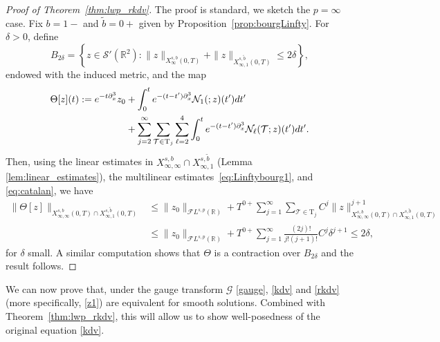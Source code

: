 \documentclass[a4paper,
11pt,  reqno]{amsart}
\makeatletter
\newcommand{\5}{\textup{V}}
\newcommand{\wt}{\widetilde}
\theoremstyle{remark}
\newcommand{\R}{\mathbb{R}}
\newcommand{\TT}{\mathcal{T}}
\newcommand{\Tr}{\mathrm{T}}
\renewcommand{\l}{\ell}
\def\<#1>{\csname MH@symb@#1\endcsname}
\newcommand{\Gc}{\mathcal{G}}
\numberwithin{equation}{section}
\numberwithin{theorem}{section}
\newcommand{\Ncal}{\mathcal{N}}
\makeatother
\begin{document}
\begin{proof}[Proof of Theorem~\ref{thm:lwp_rkdv}]
    The proof is standard, we sketch the $p=\infty$ case.  Fix $b=1-$ and $\wt{b}=0+$ given by  Proposition~\ref{prop:bourgLinfty}. 
    For $\delta>0$, define
	$$
	B_{2\delta}=\left\{ z\in \mathcal{S}'(\R^2) : \|z\|_{X^{s,b}_{\infty}(0,T)} + \|z\|_{X^{s,\wt{b}}_{\infty,1}(0,T)}\le 2\delta \right\},
	$$
    endowed with the induced metric,
    and the map
    \begin{align}
		\Theta[z](t) := e^{-t\partial_x^3}z_0 
        &+ \int_0^t e^{-(t-t')\partial_x^3} \Ncal_1(\<1>; z)(t')dt' 
        \\&+ 
        \sum_{j=2}^\infty \sum_{\TT \in \Tr_j} \sum_{\l=2}^4 
        \int_0^t e^{-(t-t')\partial_x^3} \Ncal_\l (\TT;  z)(t')dt'.
        \label{eq:Theta}
\end{align}
Then, using the linear estimates in $X^{s,b}_{\infty,\infty}\cap X^{s,\wt{b}}_{\infty,1}$ (Lemma \ref{lem:linear_estimates}), the multilinear estimates~\eqref{eq:Linftybourg1}, and \eqref{eq:catalan}, we have
\begin{align*}
		\|\Theta[z]\|_{X^{s,b}_{\infty,\infty}(0,T)\cap X^{s,\wt{b}}_{\infty,1}(0,T)} &\le \|z_0\|_{\mathcal{F}L^{s,p}(\R)} + T^{0+} \sum_{j=1}^\infty \sum_{\TT \in \Tr_{j}}  C^j\|z\|_{X^{s,b}_{\infty,\infty}(0,T)\cap X^{s,\wt{b}}_{\infty,1}(0,T)}^{j+1} \\&\le \|z_0\|_{\mathcal{F}L^{s,p}(\R)} + T^{0+} \sum_{j=1}^\infty \frac{(2j)!}{j!(j+1)!} C^j \delta^{j+1}\le 2\delta,
\end{align*}
for $\delta$ small. A similar computation shows that $\Theta$ is a contraction over $B_{2\delta}$ and the result follows.
\end{proof}




We can now prove that, under the gauge transform $\Gc$ \eqref{gauge}, \eqref{kdv} and \eqref{rkdv} (more specifically, \eqref{z1}) are equivalent for smooth solutions. 
 Combined with Theorem~\ref{thm:lwp_rkdv}, this will allow us to show well-posedness of the original equation \eqref{kdv}.
\end{document}

